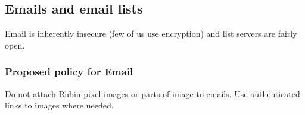 \subsection{Emails and email  lists }
Email is inherently insecure (few of us use encryption) and list servers are fairly open.

\subsubsection{Proposed policy for Email}
Do not attach Rubin pixel images or parts of image to emails.
Use authenticated links to images where needed.


